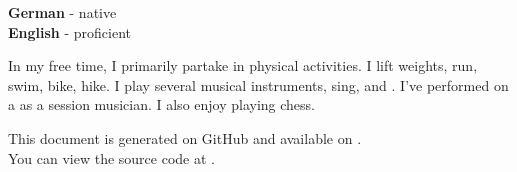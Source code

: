\documentclass[9pt]{developercv} %
\begin{document}
    \begin{minipage}[t]{0.3\textwidth}
        \vspace{-\baselineskip} %


        \textbf{German} - native\\
        \textbf{English} - proficient\\
    \end{minipage}
    \hfill
    \begin{minipage}[t]{0.5\textwidth}
        \vspace{-\baselineskip} %


        In my free time, I primarily partake in physical activities.
        I lift weights, run, swim, bike, hike.
        I play several musical instruments, sing, and
        .
        I've performed on a
        as a session musician.
        I also enjoy playing chess.
    \end{minipage}
    \hfill
    \vfill

    \footnotesize{This document is generated on GitHub and available on . \\
    You can view the source code at .}

\end{document}
